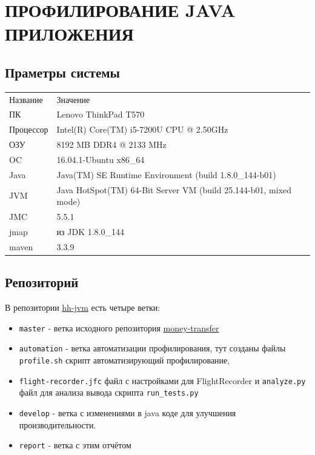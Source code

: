 \documentclass{article}
\begin{document}
	\section*{ПРОФИЛИРОВАНИЕ JAVA ПРИЛОЖЕНИЯ}
	\subsection*{Праметры системы}
	\begin{tabular}{ll}
		Название      & Значение                                  \\
		ПК            & Lenovo ThinkPad T570                      \\
		Процессор     & Intel(R) Core(TM) i5-7200U CPU @ 2.50GHz  \\
		ОЗУ           & 8192 MB DDR4 @ 2133 MHz                   \\
		OC            & 16.04.1-Ubuntu x86\_64                     \\
		Java          & Java(TM) SE Runtime Environment (build 1.8.0\_144-b01) \\
		JVM           & Java HotSpot(TM) 64-Bit Server VM (build 25.144-b01, mixed mode) \\
		JMC           & 5.5.1                                     \\
		jmap          & из JDK 1.8.0\_144                          \\
		maven          & 3.3.9                                     \\
	\end{tabular}

	\subsection*{Репозиторий}
		В репозитории  \href{https://github.com/eremeykin/hh-jvm/}{hh-jvm} есть четыре ветки:
		\begin{itemize}
			 \item \texttt{master} - ветка исходного репозитория \href{https://github.com/yarkinsv/money-transfer}{money-transfer}
			 \item \texttt{automation} - ветка автоматизации профилирования, тут созданы файлы \texttt{profile.sh} скрипт автоматизирующий профилирование, 
			 \item \texttt{flight-recorder.jfc} файл с настройками для FlightRecorder и \texttt{analyze.py} файл для анализа вывода скрипта \texttt{run\_tests.py}
			 \item \texttt{develop} - ветка с изменениями в java коде для улучшения производительности.
			 \item \texttt{report} - ветка с этим отчётом			 
		\end{itemize}
\end{document}
